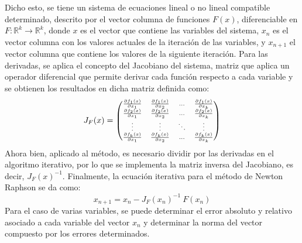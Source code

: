 \documentclass[12pt]{article}
\begin{document}
Dicho esto, se tiene un sistema de ecuaciones lineal o no lineal compatible determinado, descrito por el vector columna de funciones $F(x)$, diferenciable en $F:\mathbb{R}^k \rightarrow \mathbb{R}^k$, donde $x$ es el vector que contiene las variables del sistema, $x_n$ es el vector columna con los valores actuales de la iteración de las variables, y $x_{n+1}$ el vector columna que contiene los valores de la siguiente iteración. Para las derivadas, se aplica el concepto del Jacobiano del sistema, matriz que aplica un operador diferencial que permite derivar cada función respecto a cada variable y se obtienen los resultados en dicha matriz definida como:
\begin{equation*}
\scriptsize
    J_F(x)=\begin{pmatrix}
    \frac{\partial f_1(x)}{\partial x_1}&\frac{\partial f_1(x)}{\partial x_2}&...&\frac{\partial f_1(x)}{\partial x_k}\\ 
    \frac{\partial f_2(x)}{\partial x_1}&\frac{\partial f_2(x)}{\partial x_2}&...&\frac{\partial f_2(x)}{\partial x_k}\\ 
\vdots&\vdots&\ddots&\vdots\\
\frac{\partial f_k(x)}{\partial x_1}&\frac{\partial f_k(x)}{\partial x_2}&...&\frac{\partial f_k(x)}{\partial x_k}\\
    \end{pmatrix}
\end{equation*}
Ahora bien, aplicado al método, es necesario dividir por las derivadas en el algoritmo iterativo, por lo que se implementa la matriz inversa del Jacobiano, es decir, $J_F(x)^{-1}$. Finalmente, la ecuación iterativa para el método de Newton Raphson se da como:
\begin{equation}
    x_{n+1}=x_n-J_F(x_n)^{-1}\ F(x_n)
    \label{NR varias variables}
\end{equation}
Para el caso de varias variables, se puede determinar el error absoluto y relativo asociado a cada variable del vector $x_n$ y determinar la norma del vector compuesto por los errores determinados.
\end{document}
